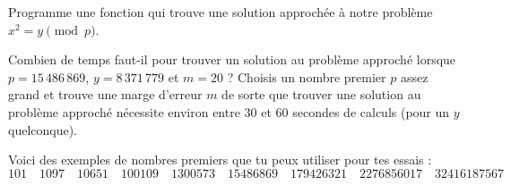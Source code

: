 \documentclass[11pt,class=report,crop=false]{standalone}
\begin{document}
\begin{activite}
\begin{enumerate}
	Programme une fonction  qui trouve une solution approchée à notre problème $x^2 = y \pmod{p}$.
	
	Combien de temps faut-il pour trouver un solution au problème approché lorsque $p = 15\,486\,869$,  $y = 8\,371\,779$ et $m=20$ ?
	Choisis un nombre premier $p$ assez grand et trouve une marge d'erreur $m$ de sorte que trouver une solution au problème approché nécessite environ entre 30 et 60 secondes de calculs (pour un $y$ quelconque).

\end{enumerate}
  

Voici des exemples de nombres premiers que tu peux utiliser pour tes essais :
$$101 \quad
1097 \quad
10651 \quad
100109 \quad
1300573 \quad
15486869 \quad 
179426321 \quad  
2276856017 \quad 
32416187567$$
\end{activite}



\end{document}
